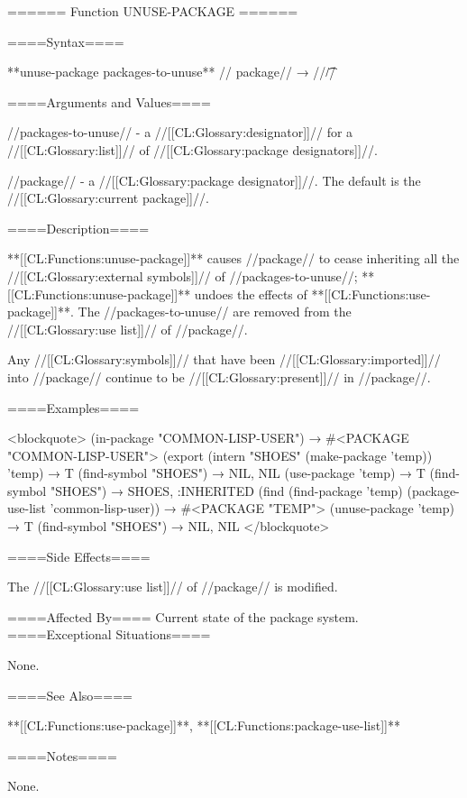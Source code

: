 ====== Function UNUSE-PACKAGE ======

====Syntax====

**unuse-package {packages-to-unuse** //\opt} package// → //\t//

====Arguments and Values====

//packages-to-unuse// - a //[[CL:Glossary:designator]]// for a //[[CL:Glossary:list]]// of //[[CL:Glossary:package designators]]//.

//package// - a //[[CL:Glossary:package designator]]//. The default is the //[[CL:Glossary:current package]]//.

====Description====

**[[CL:Functions:unuse-package]]** causes //package// to cease inheriting all the //[[CL:Glossary:external symbols]]// of //packages-to-unuse//; **[[CL:Functions:unuse-package]]** undoes the effects of **[[CL:Functions:use-package]]**. The //packages-to-unuse// are removed from the //[[CL:Glossary:use list]]// of //package//.

Any //[[CL:Glossary:symbols]]// that have been //[[CL:Glossary:imported]]// into //package// continue to be //[[CL:Glossary:present]]// in //package//.

====Examples====

<blockquote> (in-package "COMMON-LISP-USER") → #<PACKAGE "COMMON-LISP-USER"> (export (intern "SHOES" (make-package 'temp)) 'temp) → T (find-symbol "SHOES") → NIL, NIL (use-package 'temp) → T (find-symbol "SHOES") → SHOES, :INHERITED (find (find-package 'temp) (package-use-list 'common-lisp-user)) → #<PACKAGE "TEMP"> (unuse-package 'temp) → T (find-symbol "SHOES") → NIL, NIL </blockquote>

====Side Effects====

The //[[CL:Glossary:use list]]// of //package// is modified.

====Affected By==== Current state of the package system. ====Exceptional Situations====

None.

====See Also====

**[[CL:Functions:use-package]]**, **[[CL:Functions:package-use-list]]**

====Notes====

None.

